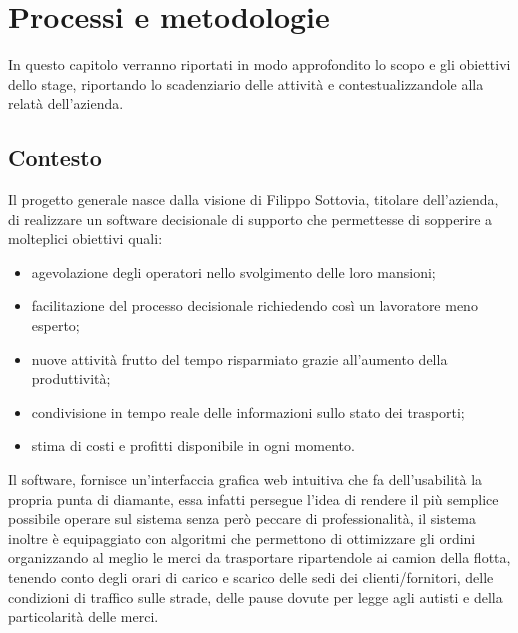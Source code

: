 \hypertarget{(chap:processi_metodologie)}{}
\chapter{Processi e metodologie}
In questo capitolo verranno riportati in modo approfondito lo scopo e gli obiettivi dello stage, riportando lo scadenziario delle attività e contestualizzandole alla relatà dell'azienda.

\section{Contesto}
Il progetto generale nasce dalla visione di Filippo Sottovia, titolare dell'azienda, di realizzare un software decisionale di supporto che permettesse di sopperire a molteplici obiettivi quali:
\begin{itemize}
	\item agevolazione degli operatori nello svolgimento delle loro mansioni;
	\item facilitazione del processo decisionale richiedendo così un lavoratore meno esperto;
	\item nuove attività frutto del tempo risparmiato grazie all'aumento della produttività;
	\item condivisione in tempo reale delle informazioni sullo stato dei trasporti;
	\item stima di costi e profitti disponibile in ogni momento.
\end{itemize}
\noindent Il software, fornisce un'interfaccia grafica web intuitiva che fa dell'usabilità la propria punta di diamante, essa infatti persegue l'idea di rendere il più semplice possibile operare sul sistema senza però peccare di professionalità, il sistema inoltre è equipaggiato con algoritmi che permettono di ottimizzare gli ordini organizzando al meglio le merci da trasportare ripartendole ai camion della flotta, tenendo conto degli orari di carico e scarico delle sedi dei clienti/fornitori, delle condizioni di traffico sulle strade, delle pause dovute per legge agli autisti e della particolarità delle merci.

